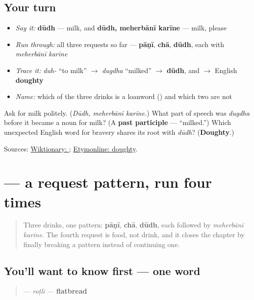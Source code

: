 \subsection*{Your turn}
\begin{itemize}
\raggedright
  \item \emph{Say it:} \textbf{dūdh} — milk, and \textbf{dūdh, meherbānī karīne} — milk, please
  \item \emph{Run through:} all three requests so far — \textbf{pāṇī}, \textbf{chā}, \textbf{dūdh}, each with \emph{meherbānī karīne}
  \item \emph{Trace it:} \emph{duh-} \textquotedblleft{}to milk\textquotedblright{} $\to$ \emph{dugdha} \textquotedblleft{}milked\textquotedblright{} $\to$ \textbf{dūdh}, and $\to$ English \textbf{doughty}
  \item \emph{Name:} which of the three drinks is a loanword (\textbf{}) and which two are not
\end{itemize}

\begin{tcolorbox}[breakable,colback=teal!4,colframe=teal!35!black,title={Before you move on}]
Ask for milk politely. (\emph{Dūdh, meherbānī karīne.}) What part of speech was \emph{dugdha} before it became a noun for milk? (A \textbf{past participle} — \textquotedblleft{}milked.\textquotedblright{}) Which unexpected English word for bravery shares its root with \emph{dūdh}? (\textbf{Doughty}.)

Sources: \href{https://en.wiktionary.org/wiki/\%E0\%AA\%A6\%E0\%AB\%82\%E0\%AA\%A7}{Wiktionary: }; \href{https://www.etymonline.com/word/doughty}{Etymonline: doughty}.
\end{tcolorbox}
\section[\texorpdfstring{\gu{રોટલી} (roṭlī)}{રોટલી (roṭlī)}]{ — a request pattern, run four times}

\label{lesson:GU-C10-rotli}



\begin{quote}
Three drinks, one pattern: \textbf{pāṇī}, \textbf{chā}, \textbf{dūdh}, each followed by \emph{meherbānī karīne}. The fourth request is food, not drink, and it closes the chapter by finally breaking a pattern instead of continuing one.
\end{quote}

\subsection*{You'll want to know first — one word}
\begin{quote}
\textbf{} — \emph{roṭlī} — \textbf{flatbread}
\end{quote}

